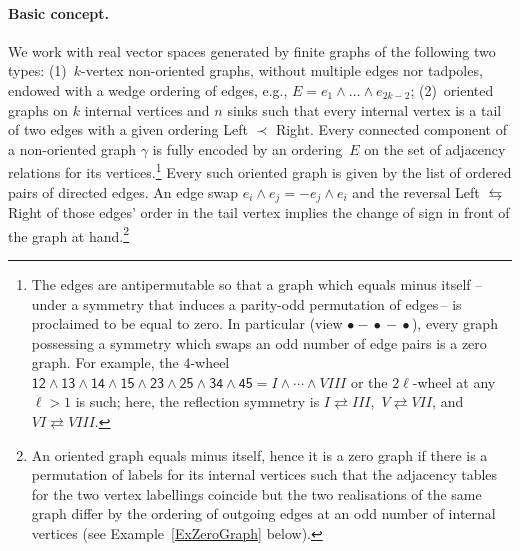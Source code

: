 \documentclass[a4paper]{jpconf}%
\theoremstyle{definition}
\theoremstyle{remark}
\begin{document}
\paragraph{\textbf{\textup{Basic concept.}}}%
We work with real vector spaces %
generated by finite graphs of the following two types: 
(1)~$k$-\/vertex non-oriented graphs, without multiple edges nor tadpoles, endowed with a wedge ordering of edges, e.g., $E=e_1\wedge\dots\wedge e_{2k-2}$; 
(2)~oriented graphs on $k$ internal vertices and $n$ sinks such that every internal vertex is a tail of two edges with a given ordering Left $\prec$ Right. Every connected component of a non-oriented graph $\gamma$ is fully encoded by an ordering~$E$ on the set of adjacency relations for its vertices.\footnote{\label{FootZeroGraph}%
The edges are antipermutable so that a graph which equals minus itself 
--\,under a symmetry that induces a parity\/-\/odd permutation of edges\,--
is proclaimed to be equal to zero.
In particular (view $\bullet\!\!\!-\!\!\!\bullet\!\!\!-\!\!\!\bullet$), every graph possessing a symmetry which swaps an odd number of edge pairs is a zero graph. For example, the $4$-\/wheel $\mathsf{12}\wedge \mathsf{13}\wedge \mathsf{14}\wedge \mathsf{15}\wedge \mathsf{23}\wedge \mathsf{25}\wedge \mathsf{34}\wedge \mathsf{45} = I\wedge\cdots\wedge VIII$ or the $2\ell$-\/wheel at any $\ell>1$ is such; here, the %
reflection symmetry is $I\rightleftarrows III$,\ $V\rightleftarrows VII$, 
and~$VI \rightleftarrows VIII$.}
Every such oriented graph is given by the list of ordered pairs of directed edges. An edge swap $e_i\wedge e_j = -e_j\wedge e_i$ and the reversal 
Left $\leftrightarrows$ Right of those edges' order in the tail vertex implies the change of sign in front of the graph at hand.\footnote{An oriented graph equals minus itself, hence it is a zero graph if there is a permutation of labels for its internal vertices such that the adjacency tables for the two vertex labellings coincide but the two realisations of the same graph differ by the ordering of outgoing edges at an odd number of internal vertices (see Example~\ref{ExZeroGraph} below).} %
\end{document}
